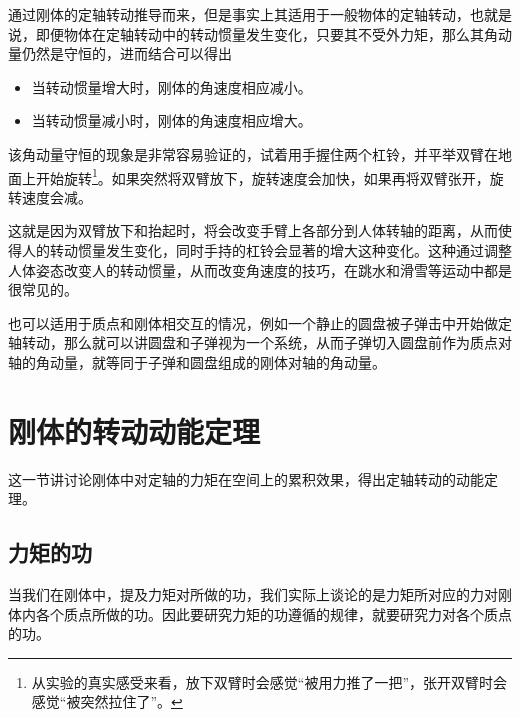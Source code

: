 通过刚体的定轴转动推导而来，但是事实上其适用于一般物体的定轴转动，也就是说，即便物体在定轴转动中的转动惯量发生变化，只要其不受外力矩，那么其角动量仍然是守恒的，进而结合可以得出
\begin{itemize}
    \item 当转动惯量增大时，刚体的角速度相应减小。
    \item 当转动惯量减小时，刚体的角速度相应增大。
\end{itemize}
该角动量守恒的现象是非常容易验证的，试着用手握住两个杠铃，并平举双臂在地面上开始旋转\footnote{从实验的真实感受来看，放下双臂时会感觉“被用力推了一把”，张开双臂时会感觉“被突然拉住了”。}。如果突然将双臂放下，旋转速度会加快，如果再将双臂张开，旋转速度会减。

这就是因为双臂放下和抬起时，将会改变手臂上各部分到人体转轴的距离，从而使得人的转动惯量发生变化，同时手持的杠铃会显著的增大这种变化。这种通过调整人体姿态改变人的转动惯量，从而改变角速度的技巧，在跳水和滑雪等运动中都是很常见的。

也可以适用于质点和刚体相交互的情况，例如一个静止的圆盘被子弹击中开始做定轴转动，那么就可以讲圆盘和子弹视为一个系统，从而子弹切入圆盘前作为质点对轴的角动量，就等同于子弹和圆盘组成的刚体对轴的角动量。

\section{刚体的转动动能定理}
这一节讲讨论刚体中对定轴的力矩在空间上的累积效果，得出定轴转动的动能定理。

\subsection{力矩的功}
当我们在刚体中，提及力矩对所做的功，我们实际上谈论的是力矩所对应的力对刚体内各个质点所做的功。因此要研究力矩的功遵循的规律，就要研究力对各个质点的功。

